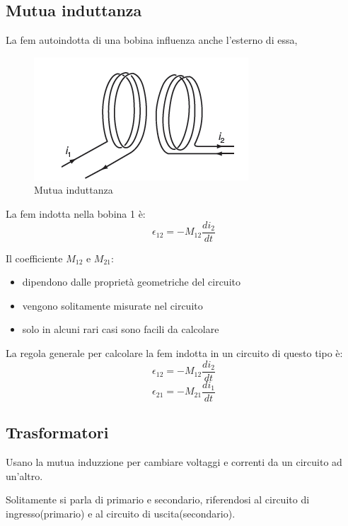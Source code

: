 \subsection{Mutua induttanza}
La fem autoindotta di una bobina influenza anche l'esterno di essa,
\begin{figure}[H]
    \centering
    \includegraphics[width=0.5\linewidth]{imgs/19 - mutua induzione.png}
    \caption{Mutua induttanza}
    \label{fig:mutua_induttanza}
\end{figure}

La fem indotta nella bobina 1 è:
\begin{equation*}
    \epsilon_{12} = -M_{12}\frac{di_2}{dt}
\end{equation*}

Il coefficiente $M_{12}$ e $M_{21}$:
\begin{itemize}
    \item dipendono dalle proprietà geometriche del circuito
    \item vengono solitamente misurate nel circuito
    \item solo in alcuni rari casi sono facili da calcolare
\end{itemize}

La regola generale per calcolare la fem indotta in un circuito di questo tipo è:
\begin{equation}
    \epsilon_{12} = -M_{12}\frac{di_2}{dt}
\end{equation}
\begin{equation}
    \epsilon_{21} = -M_{21}\frac{di_1}{dt}
\end{equation}


\subsection{Trasformatori}
Usano la mutua induzzione per cambiare voltaggi e correnti da un circuito ad un'altro.

Solitamente si parla di primario e secondario, riferendosi al circuito 
di ingresso(primario) e al circuito di uscita(secondario).

